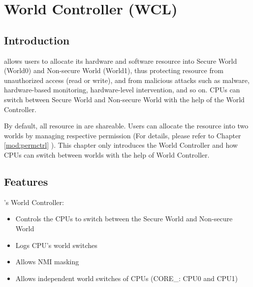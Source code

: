 \documentclass[main\_\_EN.tex]{subfiles}
\begin{document}

\ifglobal
\else
    {\let\clearpage\relax \listoftodos}
    \tableofcontents
\fi


\hypertarget{wctrl}{}
\chapter{World Controller (WCL)}\label{mod:wctrl}
\section{Introduction}
\chipname{} allows users to allocate its hardware and software resource into Secure World (World0) and Non-secure World (World1), thus protecting resource from unauthorized access (read or write), and from malicious attacks such as malware, hardware-based monitoring, hardware-level intervention, and so on. CPUs can switch between Secure World and Non-secure World with the help of the World Controller.

By default, all resource in \chipname{} are shareable. Users can allocate the resource into two worlds by managing respective permission (For details, please refer to Chapter \ref{mod:permctrl} \textit{}). This chapter only introduces the World Controller and how CPUs can switch between worlds with the help of World Controller.

\section{Features}
\label{sec:alias-features}

\chipname{}'s World Controller:
\begin{itemize}
    \item Controls the CPUs to switch between the Secure World and Non-secure World
    \item Logs CPU's world switches
    \item Allows NMI masking
    \item Allows independent world switches of CPUs (CORE\_: CPU0 and CPU1)
\end{itemize}
\end{document}
